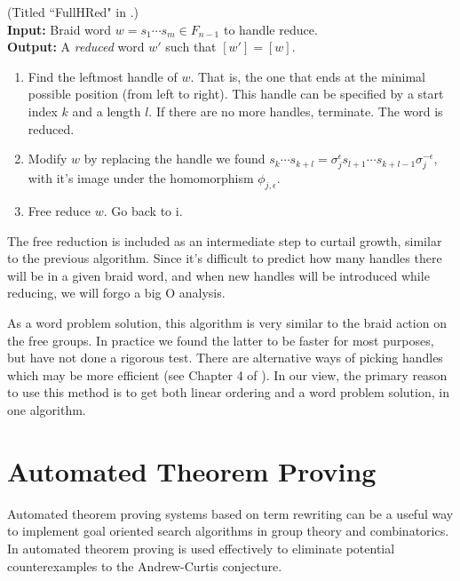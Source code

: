 \documentclass[12pt]{thesis}
\begin{document}
\begin{algorithm} (Titled ``FullHRed" in \cite{dehornoy}.)
    ~\\
    \textbf{Input:} Braid word $w = s_{1} \cdots s_{m} \in F_{n-1}$ to handle reduce.
    ~\\
    \textbf{Output:} A \textit{reduced} word $w'$ such that $[w'] = [w]$.

    \begin{enumerate}
        \item Find the leftmost handle of $w$.
            That is, the one that ends at the minimal possible position (from left to right).
              This handle can be specified by a start index $k$ and a length $l$.
              If there are no more handles, terminate. The word is reduced.

          \item Modify $w$ by replacing the handle we found
            $s_{k} \cdots s_{k + l} = \sigma_{j}^{\epsilon}s_{l+1} \cdots s_{k + l -1}\sigma_{j}^{-\epsilon}$,
              with it's image under the homomorphism $\phi_{j, \epsilon}$.

          \item Free reduce $w$. Go back to i.
    \end{enumerate}
\end{algorithm}

The free reduction is included as an intermediate step 
to curtail growth, similar to the previous algorithm.
Since it's difficult to predict how many handles there will be 
in a given braid word, 
and when new handles will be introduced while reducing, we will forgo a big O
analysis.

As a word problem solution, this algorithm
is very similar to the braid action on the free groups.
In practice we found the latter to be faster for most purposes,
but have not done a rigorous test.
There are alternative 
 ways of picking 
handles which may be more efficient (see Chapter 4 of \cite{dehornoy}).
In our view, the primary reason to use this method is to get both linear ordering
and a word problem solution, in one algorithm.

\iffalse

\section{Automated Theorem Proving}

Automated theorem proving systems based on term rewriting can be a useful way to implement goal
oriented search algorithms in group theory and combinatorics.
In \cite{ac-conjecture} automated theorem proving
is used effectively to eliminate potential counterexamples to the Andrew-Curtis conjecture.
\end{document}
